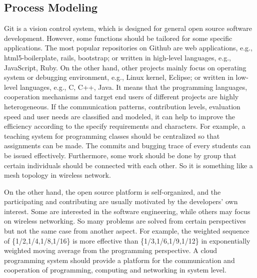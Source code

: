 \documentclass[draftclsnofoot,journal,onecolumn,12pt]{IEEEtran}
\begin{document}
\subsection{Process Modeling}
Git is a vision control system, which is designed for general open source software development. However, some functions should be tailored for some specific applications. The most popular repositories on Github are web applications, e.g., html5-boilerplate, rails, bootstrap; or written in high-level languages, e.g., JavaScript, Ruby. On the other hand, other projects mainly focus on operating system or debugging environment, e.g., Linux kernel, Eclipse; or written in low-level languages, e.g., C, C++, Java. It means that the programming languages, cooperation mechanisms and target end users of different projects are highly heterogeneous. If the communication patterns, contribution levels, evaluation speed and user needs are classified and modeled, it can help to improve the efficiency according to the specify requirements and characters. For example, a teaching system for programming classes should be centralized so that assignments can be made. The commits and bugging trace of every students can be issued effectively. Furthermore, some work should be done by group that certain individuals should be connected with each other. So it is something like a mesh topology in wireless network.
%

On the other hand, the open source platform is self-organized, and the participating and contributing are usually motivated by the developers' own interest. Some are interested in the software engineering, while others may focus on wireless networking. So many problems are solved from certain perspectives but not the same case from another aspect. For example, the weighted sequence of \{1/2,1/4,1/8,1/16\} is more effective than \{1/3,1/6,1/9,1/12\} in exponentially weighted moving average from the programming perspective. A cloud programming system should provide a platform for the communication and cooperation of programming, computing and networking in system level.
\end{document}
